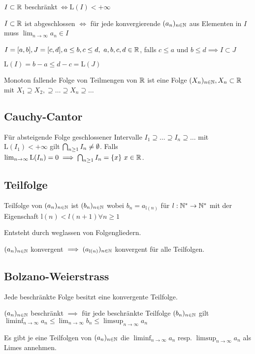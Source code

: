 \begin{compactitem}
    \item $I \subset \mathbb{R}$ beschränkt$ \ \iff \text{L}(I) < + \infty$
    \item $I \subset \mathbb{R}$ ist abgeschlossen $\iff $ für jede konvergierende $(a_n)_{n \in \mathbb{N}}$ aus Elementen in $I$ muss $\lim_{n \to \infty} a_n \in I$
    \item $I=[a, b], J=[c, d], a \le b, c \le d, \ a,b,c,d \in \R$, falls $c \le a$ und $b \le d \implies I \subset J$
        \begin{compactitem}
            \item $\text{L}(I) = b - a \le  d - c = \text{L}(J)$
        \end{compactitem}
    \item Monoton fallende Folge von Teilmengen von $\mathbb{R}$ ist eine Folge $(X_n)_{n \in \mathbb{N}}, X_n \subset \mathbb{R}$ mit $X_1 \supseteq X_2, \supseteq \dots \supseteq X_n \supseteq \dots $
\end{compactitem}

\subsection{Cauchy-Cantor}
Für absteigende Folge geschlossener Intervalle $I_1 \supseteq \dots  \supseteq I_n \supseteq \dots $ mit $\text{L}(I_1) < + \infty$ gilt $\bigcap_{n \ge 1} I_n \neq \emptyset $. Falls $\lim_{n \to \infty} \text{L}(I_n) = 0 \implies \bigcap_{n \ge  1} I_n =\{x\} \ x \in \mathbb{R} $.

\subsection{Teilfolge}
Teilfolge von $(a_n)_{n \in \mathbb{N}}$ ist $(b_n)_{n \in \mathbb{N}}$ wobei $b_n = a_{\text{l}(n)}$ für $l:\mathbb{N}^* \to \mathbb{N}^*$ mit der Eigenschaft $\text{l}(n) < l(n + 1) \forall n \ge 1$
\begin{compactitem}
    \item Entsteht durch weglassen von Folgengliedern.
    \item $(a_n)_{n \in \mathbb{N}}$ konvergent $\implies (a_{\text{l}(n)})_{n \in \mathbb{N}}$ konvergent für alle Teilfolgen.
\end{compactitem}

\subsection{Bolzano-Weierstrass}
Jede beschränkte Folge besitzt eine konvergente Teilfolge.
\begin{compactitem}
    \item $(a_n)_{n \in \mathbb{N}}$ beschränkt $\implies$ für jede beschränkte Teilfolge $(b_n)_{n \in \mathbb{N}}$ gilt $\liminf_{n \to \infty} a_n \le \lim_{n \to \infty} b_n \le  \limsup_{n \to \infty} a_n$
    \item Es gibt je eine Teilfolgen von $(a_n)_{n \in \mathbb{N}}$ die $\liminf_{n \to \infty} a_n$ resp. $\limsup_{n \to \infty} a_n$ als Limes annehmen.
\end{compactitem}

